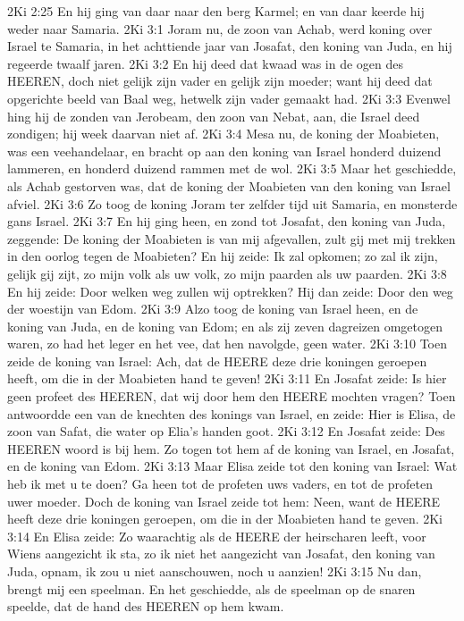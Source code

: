 2Ki 2:25  En hij ging van daar naar den berg Karmel; en van daar keerde hij weder naar Samaria.
2Ki 3:1  Joram nu, de zoon van Achab, werd koning over Israel te Samaria, in het achttiende jaar van Josafat, den koning van Juda, en hij regeerde twaalf jaren.
2Ki 3:2  En hij deed dat kwaad was in de ogen des HEEREN, doch niet gelijk zijn vader en gelijk zijn moeder; want hij deed dat opgerichte beeld van Baal weg, hetwelk zijn vader gemaakt had.
2Ki 3:3  Evenwel hing hij de zonden van Jerobeam, den zoon van Nebat, aan, die Israel deed zondigen; hij week daarvan niet af.
2Ki 3:4  Mesa nu, de koning der Moabieten, was een veehandelaar, en bracht op aan den koning van Israel honderd duizend lammeren, en honderd duizend rammen met de wol.
2Ki 3:5  Maar het geschiedde, als Achab gestorven was, dat de koning der Moabieten van den koning van Israel afviel.
2Ki 3:6  Zo toog de koning Joram ter zelfder tijd uit Samaria, en monsterde gans Israel.
2Ki 3:7  En hij ging heen, en zond tot Josafat, den koning van Juda, zeggende: De koning der Moabieten is van mij afgevallen, zult gij met mij trekken in den oorlog tegen de Moabieten? En hij zeide: Ik zal opkomen; zo zal ik zijn, gelijk gij zijt, zo mijn volk als uw volk, zo mijn paarden als uw paarden.
2Ki 3:8  En hij zeide: Door welken weg zullen wij optrekken? Hij dan zeide: Door den weg der woestijn van Edom.
2Ki 3:9  Alzo toog de koning van Israel heen, en de koning van Juda, en de koning van Edom; en als zij zeven dagreizen omgetogen waren, zo had het leger en het vee, dat hen navolgde, geen water.
2Ki 3:10  Toen zeide de koning van Israel: Ach, dat de HEERE deze drie koningen geroepen heeft, om die in der Moabieten hand te geven!
2Ki 3:11  En Josafat zeide: Is hier geen profeet des HEEREN, dat wij door hem den HEERE mochten vragen? Toen antwoordde een van de knechten des konings van Israel, en zeide: Hier is Elisa, de zoon van Safat, die water op Elia's handen goot.
2Ki 3:12  En Josafat zeide: Des HEEREN woord is bij hem. Zo togen tot hem af de koning van Israel, en Josafat, en de koning van Edom.
2Ki 3:13  Maar Elisa zeide tot den koning van Israel: Wat heb ik met u te doen? Ga heen tot de profeten uws vaders, en tot de profeten uwer moeder. Doch de koning van Israel zeide tot hem: Neen, want de HEERE heeft deze drie koningen geroepen, om die in der Moabieten hand te geven.
2Ki 3:14  En Elisa zeide: Zo waarachtig als de HEERE der heirscharen leeft, voor Wiens aangezicht ik sta, zo ik niet het aangezicht van Josafat, den koning van Juda, opnam, ik zou u niet aanschouwen, noch u aanzien!
2Ki 3:15  Nu dan, brengt mij een speelman. En het geschiedde, als de speelman op de snaren speelde, dat de hand des HEEREN op hem kwam.
